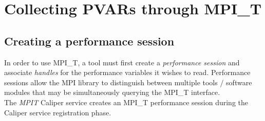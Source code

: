 \chapter*{Collecting PVARs through MPI\_T}
\section{Creating a performance session}
In order to use MPI\_T, a tool must first create a \emph{performance session} and associate \emph{handles} for the performance variables it wishes to read. Performance sessions allow the MPI library to distinguish between multiple tools / software modules that may be simultaneously querying the MPI\_T interface. \\
The \emph{MPIT} Caliper service creates an MPI\_T performance session during the Caliper service registration phase.
